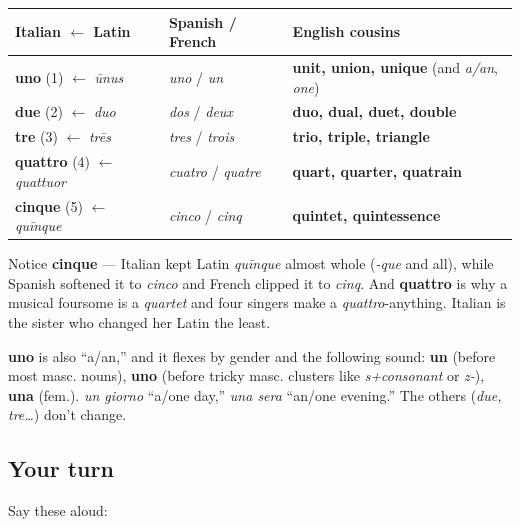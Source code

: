 \begin{cousinweb}
\noindent
\begin{tabularx}{\linewidth}{@{}>{\raggedright\arraybackslash}X>{\raggedright\arraybackslash}X>{\raggedright\arraybackslash}X@{}}
\toprule
\textbf{Italian $\leftarrow$ Latin} & \textbf{Spanish / French} & \textbf{English cousins} \\
\midrule
\textbf{uno} (1) $\leftarrow$ \emph{ūnus} & \emph{uno} / \emph{un} & \textbf{unit, union, unique} (and \emph{a/an}, \emph{one}) \\
\textbf{due} (2) $\leftarrow$ \emph{duo} & \emph{dos} / \emph{deux} & \textbf{duo, dual, duet, double} \\
\textbf{tre} (3) $\leftarrow$ \emph{trēs} & \emph{tres} / \emph{trois} & \textbf{trio, triple, triangle} \\
\textbf{quattro} (4) $\leftarrow$ \emph{quattuor} & \emph{cuatro} / \emph{quatre} & \textbf{quart, quarter, quatrain} \\
\textbf{cinque} (5) $\leftarrow$ \emph{quīnque} & \emph{cinco} / \emph{cinq} & \textbf{quintet, quintessence} \\
\bottomrule
\end{tabularx}

Notice \textbf{cinque} — Italian kept Latin \emph{quīnque} almost whole (\emph{-que} and all), while Spanish softened it to \emph{cinco} and French clipped it to \emph{cinq}. And \textbf{quattro} is why a musical foursome is a \emph{quartet} and four singers make a \emph{quattro}-anything. Italian is the sister who changed her Latin the least.
\end{cousinweb}

\begin{grammarlens}[title={Grammar Lens: uno $\to$ un / uno / una}]
\textbf{uno} is also \textquotedblleft{}a/an,\textquotedblright{} and it flexes by gender and the following sound: \textbf{un} (before most masc. nouns), \textbf{uno} (before tricky masc. clusters like \emph{s+consonant} or \emph{z-}), \textbf{una} (fem.). \emph{un giorno} \textquotedblleft{}a/one day,\textquotedblright{} \emph{una sera} \textquotedblleft{}an/one evening.\textquotedblright{} The others (\emph{due, tre…}) don't change.
\end{grammarlens}

\subsection*{Your turn}
Say these aloud:

